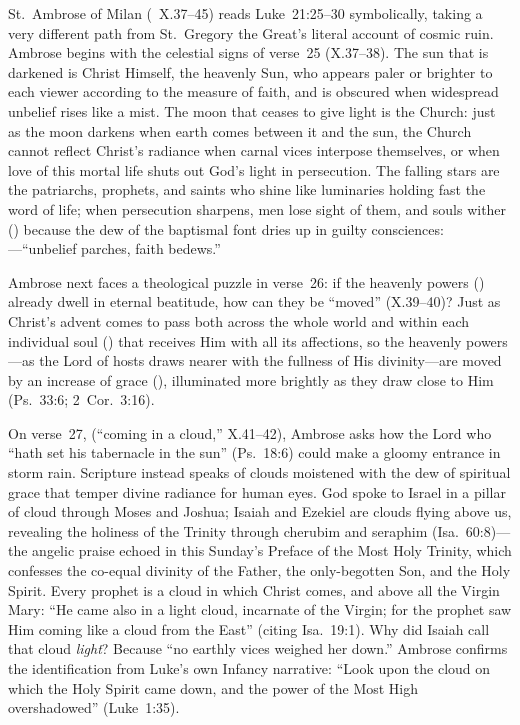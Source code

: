 St.~Ambrose of Milan (~X.37--45) reads Luke~21:25--30 symbolically, taking a very different path from St.~Gregory the Great's literal account of cosmic ruin. Ambrose begins with the celestial signs of verse~25 (X.37--38). The sun that is darkened is Christ Himself, the heavenly Sun, who appears paler or brighter to each viewer according to the measure of faith, and is obscured when widespread unbelief rises like a mist. The moon that ceases to give light is the Church: just as the moon darkens when earth comes between it and the sun, the Church cannot reflect Christ's radiance when carnal vices interpose themselves, or when love of this mortal life shuts out God's light in persecution. The falling stars are the patriarchs, prophets, and saints who shine like luminaries holding fast the word of life; when persecution sharpens, men lose sight of them, and souls wither () because the dew of the baptismal font dries up in guilty consciences: ---``unbelief parches, faith bedews.''

Ambrose next faces a theological puzzle in verse~26: if the heavenly powers () already dwell in eternal beatitude, how can they be ``moved'' (X.39--40)? Just as Christ's advent comes to pass both across the whole world and within each individual soul () that receives Him with all its affections, so the heavenly powers---as the Lord of hosts draws nearer with the fullness of His divinity---are moved by an increase of grace (), illuminated more brightly as they draw close to Him (Ps.~33:6; 2~Cor.~3:16).

On verse~27,  (``coming in a cloud,'' X.41--42), Ambrose asks how the Lord who ``hath set his tabernacle in the sun'' (Ps.~18:6) could make a gloomy entrance in storm rain. Scripture instead speaks of clouds moistened with the dew of spiritual grace that temper divine radiance for human eyes. God spoke to Israel in a pillar of cloud through Moses and Joshua; Isaiah and Ezekiel are clouds flying above us, revealing the holiness of the Trinity through cherubim and seraphim (Isa.~60:8)---the angelic praise echoed in this Sunday's Preface of the Most Holy Trinity, which confesses the co-equal divinity of the Father, the only-begotten Son, and the Holy Spirit. Every prophet is a cloud in which Christ comes, and above all the Virgin Mary: ``He came also in a light cloud, incarnate of the Virgin; for the prophet saw Him coming like a cloud from the East'' (citing Isa.~19:1). Why did Isaiah call that cloud \emph{light}? Because ``no earthly vices weighed her down.'' Ambrose confirms the identification from Luke's own Infancy narrative: ``Look upon the cloud on which the Holy Spirit came down, and the power of the Most High overshadowed'' (Luke~1:35).


